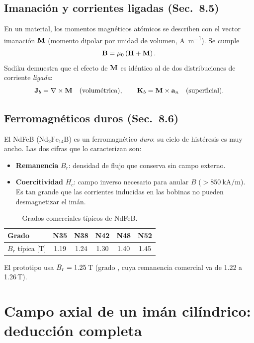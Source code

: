 \documentclass[11pt]{article}
\begin{document}
\subsection{Imanación y corrientes ligadas (Sec.~8.5)}
En un material, los momentos magnéticos atómicos se describen con el vector imanación $\mathbf{M}$ (momento
dipolar por unidad de volumen, \si{\ampere\per\meter}). Se cumple
\begin{equation}
  \mathbf{B} = \mu_0\left(\mathbf{H}+\mathbf{M}\right).
\end{equation}
Sadiku demuestra que el efecto de $\mathbf{M}$ es idéntico al de dos distribuciones de corriente
\emph{ligada}:
\begin{equation}
  \mathbf{J}_b = \nabla\times\mathbf{M} \quad\text{(volumétrica)}, \qquad
  \mathbf{K}_b = \mathbf{M}\times\mathbf{a}_{n} \quad\text{(superficial)}.
  \label{eq:ligadas}
\end{equation}

\subsection{Ferromagnéticos duros (Sec.~8.6)}
El NdFeB ($\mathrm{Nd_2Fe_{14}B}$) es un ferromagnético \emph{duro}: su ciclo de histéresis es muy ancho.
Las dos cifras que lo caracterizan son:
\begin{itemize}
  \item \textbf{Remanencia} $B_r$: densidad de flujo que conserva sin campo externo.
  \item \textbf{Coercitividad} $H_c$: campo inverso necesario para anular $B$ ($>\SI{850}{\kilo\ampere\per\meter}$).
        Es tan grande que las corrientes inducidas en las bobinas no pueden desmagnetizar el imán.
\end{itemize}

\begin{table}[H]
\centering
\caption{Grados comerciales típicos de NdFeB.}
\begin{tabular}{lccccc}
\toprule
Grado & N35 & N38 & N42 & N48 & N52\\
\midrule
$B_r$ típica [T] & 1.19 & 1.24 & 1.30 & 1.40 & 1.45\\
\bottomrule
\end{tabular}
\end{table}
El prototipo usa $B_r=1.25$\,T (grado \ValGradoIman, cuya remanencia comercial va de 1.22 a 1.26\,T).

\section{Campo axial de un imán cilíndrico: deducción completa}
\end{document}
